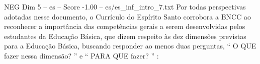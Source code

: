 \begin{textsample}{NEG Dim 5 – es – Score -1.00 – es/es\_inf\_intro\_7.txt}
Por todas perspectivas adotadas nesse documento, o Currículo do Espírito Santo corrobora a BNCC ao reconhecer a importância das competências gerais a serem desenvolvidas pelos estudantes da Educação Básica, que dizem respeito às dez dimensões previstas para a Educação Básica, buscando responder ao menos duas perguntas, “ O QUE fazer nessa dimensão? ” e “ PARA QUE fazer? ” :

\end{textsample}

